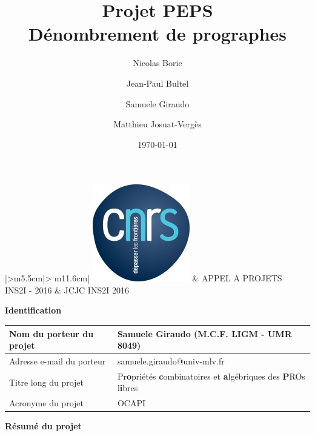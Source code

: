 \documentclass[10pt,reqno]{amsart}
\title{Projet PEPS \\
Dénombrement de prographes}
\date{\today}
\author{Nicolas Borie}
\author{Jean-Paul Bultel}
\author{Samuele Giraudo}
\author{Matthieu Josuat-Vergès}
\numberwithin{equation}{subsection}
\begin{document}

\begin{tabular}{|>{\centering\arraybackslash}m{5.5cm}|>
    {\centering\arraybackslash}m{11.6cm}|} \hline
    \includegraphics{logo_CNRS.jpg} & \Large{APPEL A PROJETS} \\
    INS2I - 2016 & \Large{JCJC INS2I 2016} \\ \hline
\end{tabular}
\bigskip

\Large{\bf{Identification}}

\begin{tabular}{|m{5.5cm}|m{11.6cm}|} \hline
    Nom du porteur du projet & Samuele Giraudo (M.C.F. LIGM - UMR 8049)
        \\ \hline
    Adresse e-mail du porteur & samuele.giraudo@univ-mlv.fr \\ \hline
    Titre long du projet & Pr{\bf o}priétés {\bf c}ombinatoires et
    {\bf a}lgébriques des {\bf P}ROs l{\bf i}bres\\ \hline
    Acronyme du projet & OCAPI \\ \hline
\end{tabular}
\bigskip

\Large{\bf{Résumé du projet}}
\end{document}
